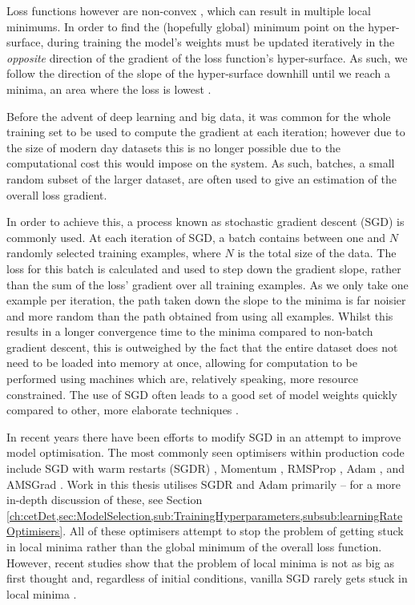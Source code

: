 Loss functions however are non-convex \cite{choromanska_loss_2015}, which can result in multiple local minimums. In order to find the (hopefully global) minimum point on the hyper-surface, during training the model's weights must be updated iteratively in the \textit{opposite} direction of the gradient of the loss function's hyper-surface. As such, we follow the direction of the slope of the hyper-surface downhill until we reach a minima, an area where the loss is lowest \cite{ruder_overview_2016}. 

Before the advent of deep learning and big data, it was common for the whole training set to be used to compute the gradient at each iteration; however due to the size of modern day datasets this is no longer possible due to the computational cost this would impose on the system. As such, batches, a small random subset of the larger dataset, are often used to give an estimation of the overall loss gradient.

In order to achieve this, a process known as stochastic gradient descent (SGD) is commonly used. At each iteration of SGD, a batch contains between one and $N$ randomly selected training examples, where $N$ is the total size of the data. The loss for this batch is calculated and used to step down the gradient slope, rather than the sum of the loss' gradient over all training examples. As we only take one example per iteration, the path taken down the slope to the minima is far noisier and more random than the path obtained from using all examples. Whilst this results in a longer convergence time to the minima compared to non-batch gradient descent, this is outweighed by the fact that the entire dataset does not need to be loaded into memory at once, allowing for computation to be performed using machines which are, relatively speaking, more resource constrained. The use of SGD often leads to a good set of model weights quickly compared to other, more elaborate techniques \cite{bottou_tradeoffs_2008}. 

In recent years there have been efforts to modify SGD in an attempt to improve model optimisation. The most commonly seen optimisers within production code include SGD with warm restarts (SGDR) \cite{loshchilov_sgdr:_2016}, Momentum \cite{qian_momentum_1999}, RMSProp \cite{tieleman_lecture_2012}, Adam \cite{kingma_adam:_2014}, and AMSGrad \cite{reddi_convergence_2019}. Work in this thesis utilises SGDR and Adam primarily -- for a more in-depth discussion of these, see Section \ref{ch:cetDet,sec:ModelSelection,sub:TrainingHyperparameters,subsub:learningRateOptimisers}. All of these optimisers attempt to stop the problem of getting stuck in local minima rather than the global minimum of the overall loss function. However, recent studies show that the problem of local minima is not as big as first thought and, regardless of initial conditions, vanilla SGD rarely gets stuck in local minima \cite{dauphin_identifying_2014, choromanska_loss_2015}.

